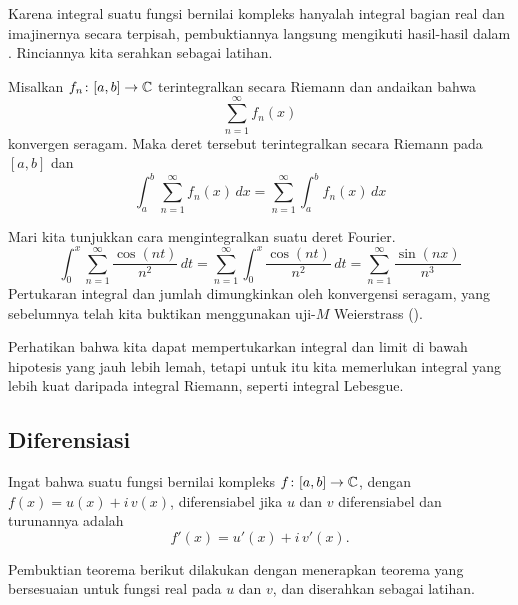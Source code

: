 Karena integral suatu fungsi bernilai kompleks hanyalah integral
bagian real dan imajinernya secara terpisah,
pembuktiannya langsung mengikuti hasil-hasil dalam
.
Rinciannya kita serahkan sebagai latihan.

\begin{cor}
\pagebreak[2]
Misalkan $f_n \colon [a,b] \to {\mathbb{C}}$
terintegralkan secara Riemann dan andaikan bahwa
\begin{equation*}
\sum_{n=1}^\infty f_n(x)
\end{equation*}
konvergen seragam. Maka deret tersebut terintegralkan secara Riemann pada $[a,b]$
dan
\begin{equation*}
\int_a^b \sum_{n=1}^\infty f_n(x) \,dx
=
\sum_{n=1}^\infty \int_a^b f_n(x) \,dx
\end{equation*}
\end{cor}

\begin{example}
Mari kita tunjukkan cara mengintegralkan suatu deret Fourier.
\begin{equation*}
\int_{0}^x \sum_{n=1}^\infty \frac{\cos(nt)}{n^2} \,dt
=
\sum_{n=1}^\infty \int_{0}^x \frac{\cos(nt)}{n^2}\,dt
=
\sum_{n=1}^\infty \frac{\sin(nx)}{n^3}
\end{equation*}
Pertukaran integral dan jumlah dimungkinkan oleh konvergensi seragam,
yang sebelumnya telah kita buktikan menggunakan uji-$M$ Weierstrass
().
\end{example}

Perhatikan bahwa kita dapat mempertukarkan integral dan limit di bawah hipotesis yang jauh lebih lemah,
tetapi untuk itu kita memerlukan integral yang lebih kuat daripada integral Riemann,
seperti integral Lebesgue.

\subsection{Diferensiasi}

Ingat bahwa suatu fungsi bernilai kompleks
$f \colon [a,b] \to {\mathbb{C}}$, dengan $f(x) = u(x)+i\,v(x)$,
diferensiabel jika $u$ dan $v$ diferensiabel
dan turunannya adalah
\begin{equation*}
f'(x) = u'(x)+i\,v'(x) .
\end{equation*}

Pembuktian teorema berikut dilakukan dengan menerapkan teorema yang bersesuaian untuk
fungsi real pada $u$ dan $v$, dan diserahkan sebagai latihan.

